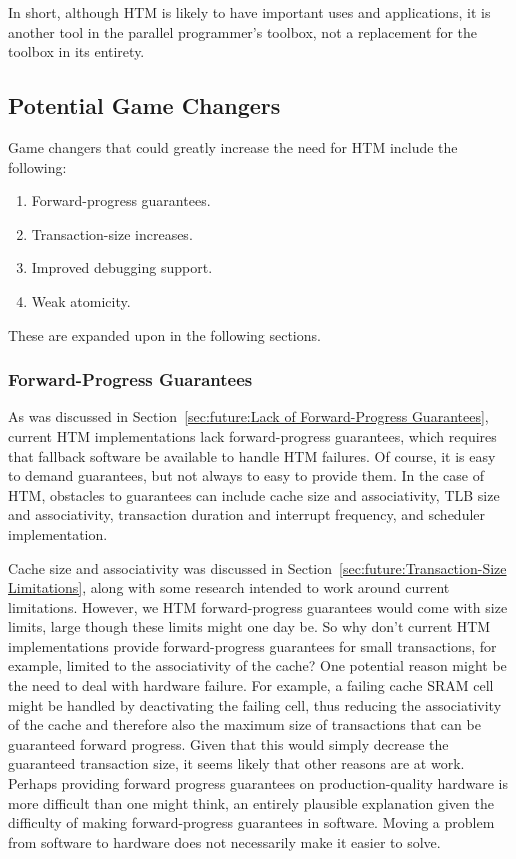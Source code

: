 In short, although HTM is likely to have important uses and applications,
it is another tool in the parallel programmer's toolbox, not a replacement
for the toolbox in its entirety.

\subsection{Potential Game Changers}
\label{sec:future:Potential Game Changers}

Game changers that could greatly increase the need for HTM include
the following:

\begin{enumerate}
\item	Forward-progress guarantees.
\item	Transaction-size increases.
\item	Improved debugging support.
\item	Weak atomicity.
\end{enumerate}

These are expanded upon in the following sections.

\subsubsection{Forward-Progress Guarantees}
\label{sec:future:Forward-Progress Guarantees}

As was discussed in
Section~\ref{sec:future:Lack of Forward-Progress Guarantees},
current HTM implementations lack forward-progress guarantees, which requires
that fallback software be available to handle HTM failures.
Of course, it is easy to demand guarantees, but not always to easy
to provide them.
In the case of HTM, obstacles to guarantees can include cache size and
associativity, TLB size and associativity, transaction duration and
interrupt frequency, and scheduler implementation.

Cache size and associativity was discussed in
Section~\ref{sec:future:Transaction-Size Limitations},
along with some research intended to work around current limitations.
However, we HTM forward-progress guarantees would
come with size limits, large though these limits might one day be.
So why don't current HTM implementations provide forward-progress
guarantees for small transactions, for example, limited to the
associativity of the cache?
One potential reason might be the need to deal with hardware failure.
For example, a failing cache SRAM cell might be handled by deactivating
the failing cell, thus reducing the associativity of the cache and
therefore also the maximum size of transactions that can be guaranteed
forward progress.
Given that this would simply decrease the guaranteed transaction size,
it seems likely that other reasons are at work.
Perhaps providing forward progress guarantees on production-quality
hardware is more difficult than one might think, an entirely plausible
explanation given the difficulty of making forward-progress guarantees
in software.
Moving a problem from software to hardware does not necessarily make
it easier to solve.

